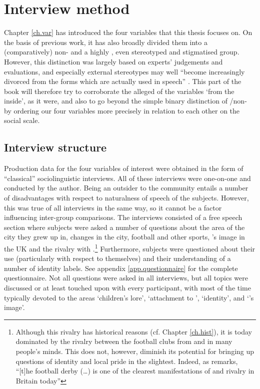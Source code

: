 \chapter{Interview method}\label{ch.prod_method}

Chapter \ref{ch.var} has introduced the four variables that this thesis focuses on.
On the basis of previous work, it has also broadly divided them into a (comparatively) non- and a highly , even stereotyped and stigmatised group.
However, this distinction was largely based on experts' judgements and evaluations, and especially external stereotypes may well ``become increasingly divorced from the forms which are actually used in speech'' \parencite[180]{labov1972}.
This part of the book will therefore try to corroborate the alleged  of the variables `from the inside', as it were, and also to go beyond the simple binary distinction of /non- by ordering our four variables more precisely in relation to each other on the social  scale.

	\section{Interview structure}\label{sec.prod_method.interview}
	
Production data for the four variables of interest were obtained in the form of ``classical'' sociolinguistic interviews.
All of these interviews were one-on-one and conducted by the author.
Being an outsider to the community entails a number of disadvantages with respect to naturalness of speech of the subjects.
However, this was true of all interviews in the same way, so it cannot be a factor influencing inter-group comparisons.
The interviews consisted of a free speech section where subjects were asked a number of questions about the area of the city they grew up in, changes in the city, football and other sports, 's image in the UK and the rivalry with .\footnote{Although this rivalry has historical reasons (cf. Chapter \ref{ch.hist}), it is today dominated by the rivalry between the football clubs from  and  in many people's minds. This does not, however, diminish its potential for bringing up questions of identity and local pride in the slightest. Indeed, as \textcite[97]{beal2010} remarks, ``[t]he football derby (\dots) is one of the clearest manifestations of  and rivalry in Britain today''}
Furthermore, subjects were questioned about their use (particularly with respect to themselves) and their understanding of a number of identity labels.
See appendix \ref{app.questionnaire} for the complete questionnaire.
Not all questions were asked in all interviews, but all topics were discussed or at least touched upon with every participant, with most of the time typically devoted to the areas `children's lore', `attachment to ', `identity', and `'s image'.

